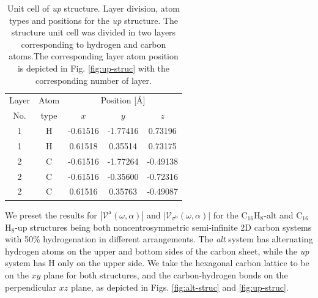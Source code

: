 \documentclass[prb,11pt,tightenlines,twocolumn,aps]{revtex4-1}
\begin{document}
\begin{table}[t]
\center
\begin{tabular}{ccccc}\\
\hline
\quad Layer \quad & \quad Atom \qquad & \multicolumn{3}{c}{Position [\AA]} \\
\cline{3-5}
\quad No.   \quad & \quad type \qquad & $x$ & $y$ & $z$  \\
\hline
1 & H & -0.61516 & -1.77416 &  0.73196 \\
1 & H &  0.61518 &  0.35514 &  0.73175 \\
2 & C & -0.61516 & -1.77264 & -0.49138 \\
2 & C & -0.61516 & -0.35600 & -0.72316 \\
2 & C &  0.61516 &  0.35763 & -0.49087 \\
\hline
\end{tabular}

\caption{Unit cell of \emph{up} structure. Layer division, atom types and
positions for the \emph{up} structure. The structure unit cell was divided in
two layers corresponding to hydrogen and carbon atoms.The corresponding layer
atom position is depicted in Fig. \ref{fig:up-struc} with the corresponding
number of layer.}
\label{tab:up-unitcell}
\end{table}

We preset the results for $|\mathcal{V}^{\mathrm{a}}(\omega,\alpha)|$ and
$|\mathcal{V}_{\sigma^{\mathrm{b}}}(\omega,\alpha)|$ for the C$_{16}$H$_{8}$-alt
and C$_{16}$H$_{8}$-up structures being both noncentrosymmetric semi-infinite 2D
carbon systems with 50\% hydrogenation in different arrangements. The \emph{alt}
system has alternating hydrogen atoms on the upper and bottom sides of the
carbon sheet, while the \emph{up} system has H only on the upper side. We take
the hexagonal carbon lattice to be on the $xy$ plane for both structures, and
the carbon-hydrogen bonds on the perpendicular $xz$ plane, as depicted in Figs.
\ref{fig:alt-struc} and \ref{fig:up-struc}.
\end{document}
